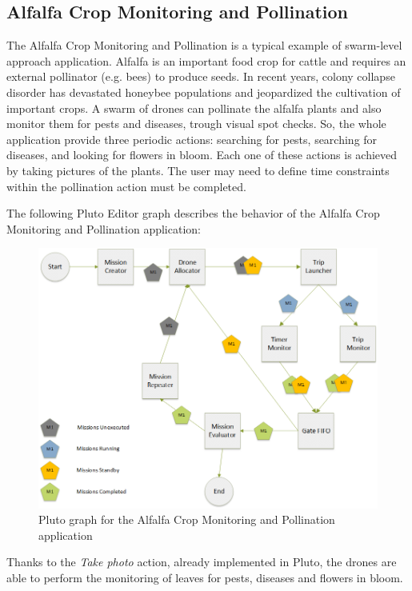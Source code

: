 \subsection{Alfalfa Crop Monitoring and Pollination}\label{alfalfa}

The Alfalfa Crop Monitoring and Pollination\cite{alfalfa} is a typical example of swarm-level approach application.
Alfalfa is an important food crop for cattle and requires an external pollinator (e.g. bees) to produce seeds. In recent years, colony collapse disorder has devastated honeybee populations and jeopardized the cultivation of important crops.
A swarm of drones can pollinate the alfalfa plants and also monitor them for pests and diseases, trough visual spot checks.
So, the whole application provide three periodic actions: searching for pests, searching for diseases, and looking for flowers in bloom.
Each one of these actions is achieved by taking pictures of the plants.
The user may need to define time constraints within the pollination action must be completed.

The following Pluto Editor graph describes the behavior of the Alfalfa Crop Monitoring and Pollination\cite{alfalfa} application:

\begin{figure}[H]
  \centering
  \includegraphics[width=\linewidth]{pictures/Alfalfa_Diagram.png}
  \caption{Pluto graph for the Alfalfa Crop Monitoring and Pollination application}
  \label{fig:alfalfaGraph}
\end{figure}

Thanks to the \textit{Take photo} action, already implemented in Pluto, the drones are able to perform the monitoring of leaves for pests, diseases and flowers in bloom.
\\

